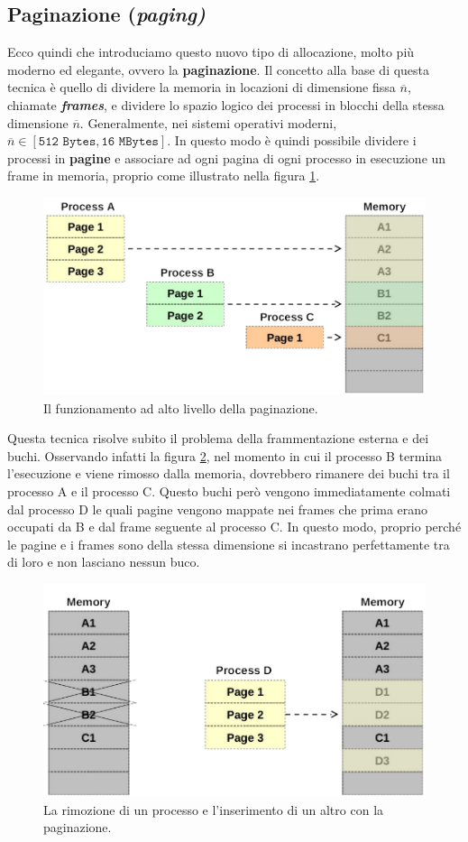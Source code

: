 \subsection{Paginazione (\textit{paging)}}\label{paginazione}
Ecco quindi che introduciamo questo nuovo tipo di allocazione, molto più moderno ed elegante, ovvero la \textbf{paginazione}. Il concetto alla base di questa tecnica è quello di dividere la memoria in locazioni di dimensione fissa $\overline{n}$, chiamate \textbf{\textit{frames}}, e dividere lo spazio logico dei processi in blocchi della stessa dimensione $\overline{n}$. Generalmente, nei sistemi operativi moderni, $\overline{n}\in [ \texttt{512 Bytes},\texttt{16 MBytes} ]$. In questo modo è quindi possibile dividere i processi in \textbf{pagine} e associare ad ogni pagina di ogni processo in esecuzione un frame in memoria, proprio come illustrato nella figura \ref{fig:paging}.
\begin{figure}[h]
    \centering
    \includegraphics[width = .6\textwidth]{../res/imgs/main memory/paging.png}
    \caption{Il funzionamento ad alto livello della paginazione.}
    \label{fig:paging}
\end{figure}
Questa tecnica risolve subito il problema della frammentazione esterna e dei buchi. Osservando infatti la figura \ref{fig:remove_process_paging}, nel momento in cui il processo B termina l'esecuzione e viene rimosso dalla memoria, dovrebbero rimanere dei buchi tra il processo A e il processo C. Questo buchi però vengono immediatamente colmati dal processo D le quali pagine vengono mappate nei frames che prima erano occupati da B e dal frame seguente al processo C. In questo modo, proprio perché le pagine e i frames sono della stessa dimensione si incastrano perfettamente tra di loro e non lasciano nessun buco.
\begin{figure}[h]
    \centering
    \includegraphics[width = .6\textwidth]{../res/imgs/main memory/remove_process_paging.png}
    \caption{La rimozione di un processo e l'inserimento di un altro con la paginazione.}
    \label{fig:remove_process_paging}
\end{figure}

